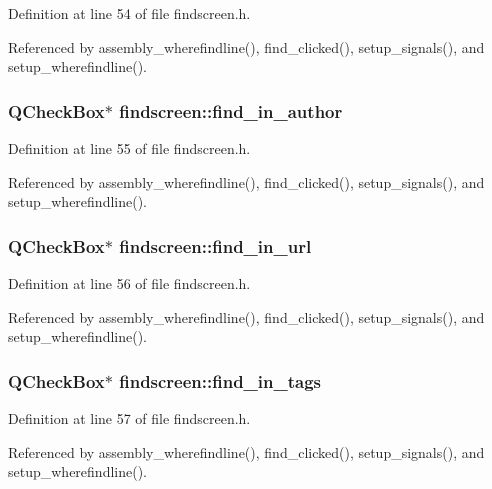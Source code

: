 Definition at line 54 of file findscreen.h.

Referenced by assembly\_\-wherefindline(), find\_\-clicked(), setup\_\-signals(), and setup\_\-wherefindline().
\subsubsection{\setlength{\rightskip}{0pt plus 5cm}QCheck\-Box$\ast$ {\bf findscreen::find\_\-in\_\-author}\hspace{0.3cm}{\tt  [private]}}\label{classfindscreen_477073cf51add2711594bc0210ad4384}




Definition at line 55 of file findscreen.h.

Referenced by assembly\_\-wherefindline(), find\_\-clicked(), setup\_\-signals(), and setup\_\-wherefindline().
\subsubsection{\setlength{\rightskip}{0pt plus 5cm}QCheck\-Box$\ast$ {\bf findscreen::find\_\-in\_\-url}\hspace{0.3cm}{\tt  [private]}}\label{classfindscreen_b1e5580091a5e4dfaf77e0c08b86ac9a}




Definition at line 56 of file findscreen.h.

Referenced by assembly\_\-wherefindline(), find\_\-clicked(), setup\_\-signals(), and setup\_\-wherefindline().
\subsubsection{\setlength{\rightskip}{0pt plus 5cm}QCheck\-Box$\ast$ {\bf findscreen::find\_\-in\_\-tags}\hspace{0.3cm}{\tt  [private]}}\label{classfindscreen_278085c269b591f3f21dc8d9b3bbeb36}




Definition at line 57 of file findscreen.h.

Referenced by assembly\_\-wherefindline(), find\_\-clicked(), setup\_\-signals(), and setup\_\-wherefindline().
